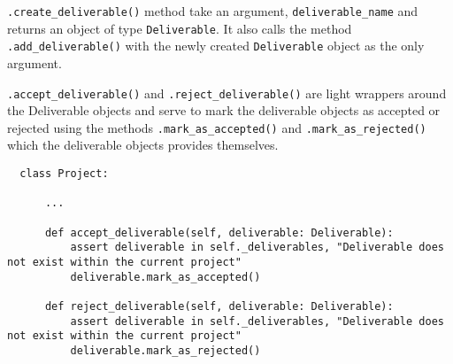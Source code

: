 \verb+.create_deliverable()+ method take an argument, \verb+deliverable_name+ and returns an object of type \verb+Deliverable+. It also calls the method \verb+.add_deliverable()+ with the newly created \verb+Deliverable+ object as the only argument.

\verb+.accept_deliverable()+ and \verb+.reject_deliverable()+ are light wrappers around the Deliverable objects and serve to mark the deliverable objects as accepted or rejected using the methods \verb+.mark_as_accepted()+ and \verb+.mark_as_rejected()+ which the deliverable objects provides themselves.

\begin{lstlisting}
  class Project:

      ...

      def accept_deliverable(self, deliverable: Deliverable):
          assert deliverable in self._deliverables, "Deliverable does not exist within the current project"
          deliverable.mark_as_accepted()

      def reject_deliverable(self, deliverable: Deliverable):
          assert deliverable in self._deliverables, "Deliverable does not exist within the current project"
          deliverable.mark_as_rejected()
\end{lstlisting}
